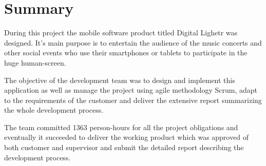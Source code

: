 \section{Summary}
During this project the mobile software product titled Digital Lighetr was designed. It's main purpose is to entertain the audience of the music concerts and other social events who use their smartphones or tablets to participate in the huge human-screen.

The objective of the development team was to design and implement this application as well as manage the project using agile methodology Scrum, adapt to the requirements of the customer and deliver the extensive report summarizing the whole development process.

The team committed 1363 person-hours for all the project obligations and eventually it succeeded to deliver the working product which was approved of both customer and supervisor and submit the detailed report describing the development process.

